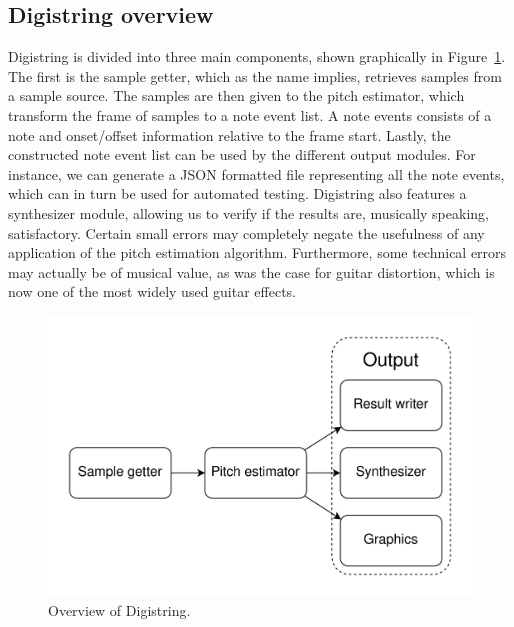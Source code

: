 \documentclass[10pt,twocolumn]{article}
\begin{document}
\subsection{Digistring overview}
Digistring is divided into three main components, shown graphically in Figure~\ref{fig:digistring_overview}. The first is the sample getter, which as the name implies, retrieves samples from a sample source. The samples are then given to the pitch estimator, which transform the frame of samples to a note event list. A note events consists of a note and onset/offset information relative to the frame start. Lastly, the constructed note event list can be used by the different output modules. For instance, we can generate a JSON formatted file representing all the note events, which can in turn be used for automated testing. Digistring also features a synthesizer module, allowing us to verify if the results are, musically speaking, satisfactory. Certain small errors may completely negate the usefulness of any application of the pitch estimation algorithm. Furthermore, some technical errors may actually be of musical value, as was the case for guitar distortion, which is now one of the most widely used guitar effects.
\begin{figure}[h]
    \centering
    \includegraphics[width=\linewidth]{fig/digistring_overview.png}
    \caption{Overview of Digistring.}
    \label{fig:digistring_overview}
\end{figure}
\end{document}

